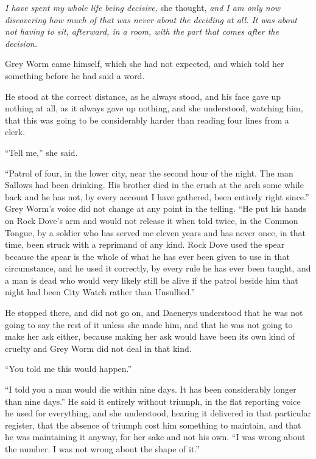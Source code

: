 \textit{I have spent my whole life being decisive,} she thought, \textit{and I am only now discovering how much of that was never about the deciding at all. It was about not having to sit, afterward, in a room, with the part that comes after the decision.}

\sceneBreak

Grey Worm came himself, which she had not expected, and which told her something before he had said a word.

He stood at the correct distance, as he always stood, and his face gave up nothing at all, as it always gave up nothing, and she understood, watching him, that this was going to be considerably harder than reading four lines from a clerk.

“Tell me,” she said.

“Patrol of four, in the lower city, near the second hour of the night. The man Sallows had been drinking. His brother died in the crush at the arch some while back and he has not, by every account I have gathered, been entirely right since.” Grey Worm’s voice did not change at any point in the telling. “He put his hands on Rock Dove’s arm and would not release it when told twice, in the Common Tongue, by a soldier who has served me eleven years and has never once, in that time, been struck with a reprimand of any kind. Rock Dove used the spear because the spear is the whole of what he has ever been given to use in that circumstance, and he used it correctly, by every rule he has ever been taught, and a man is dead who would very likely still be alive if the patrol beside him that night had been City Watch rather than Unsullied.”

He stopped there, and did not go on, and Daenerys understood that he was not going to say the rest of it unless she made him, and that he was not going to make her ask either, because making her ask would have been its own kind of cruelty and Grey Worm did not deal in that kind.

“You told me this would happen.”

“I told you a man would die within nine days. It has been considerably longer than nine days.” He said it entirely without triumph, in the flat reporting voice he used for everything, and she understood, hearing it delivered in that particular register, that the absence of triumph cost him something to maintain, and that he was maintaining it anyway, for her sake and not his own. “I was wrong about the number. I was not wrong about the shape of it.”

